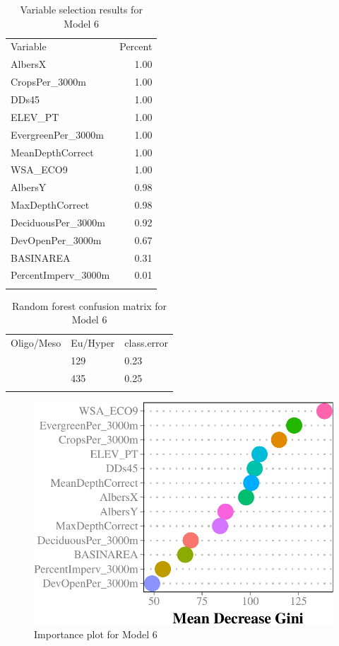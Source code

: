 \documentclass[11pt,]{article}
\begin{document}
\begin{longtable}[c]{@{}lr@{}}
\toprule\addlinespace
Variable & Percent
\\\addlinespace
\midrule\endhead
AlbersX & 1.00
\\\addlinespace
CropsPer\_3000m & 1.00
\\\addlinespace
DDs45 & 1.00
\\\addlinespace
ELEV\_PT & 1.00
\\\addlinespace
EvergreenPer\_3000m & 1.00
\\\addlinespace
MeanDepthCorrect & 1.00
\\\addlinespace
WSA\_ECO9 & 1.00
\\\addlinespace
AlbersY & 0.98
\\\addlinespace
MaxDepthCorrect & 0.98
\\\addlinespace
DeciduousPer\_3000m & 0.92
\\\addlinespace
DevOpenPer\_3000m & 0.67
\\\addlinespace
BASINAREA & 0.31
\\\addlinespace
PercentImperv\_3000m & 0.01
\\\addlinespace
\bottomrule
\addlinespace
\caption{Variable selection results for Model 6}
\end{longtable}

\begin{longtable}[c]{@{}lll@{}}
\toprule\addlinespace
Oligo/Meso & Eu/Hyper & class.error
\\\addlinespace
\midrule\endhead
428 & 129 & 0.23
\\\addlinespace
146 & 435 & 0.25
\\\addlinespace
\bottomrule
\addlinespace
\caption{Random forest confusion matrix for Model 6}
\end{longtable}

\begin{figure}[htbp]
\centering
\includegraphics{./manuscript_files/figure-latex/Importance_Model6.pdf}
\caption{Importance plot for Model 6}
\end{figure}
\end{document}
